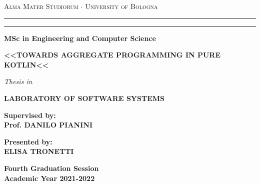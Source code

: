 \begin{titlepage}
    \begin{center}
    {{\Large{
        \textsc{Alma Mater Studiorum $\cdot$ University of Bologna}
    }}}
    \rule[0.1cm]{15.8cm}{0.1mm}
    \rule[0.5cm]{15.8cm}{0.6mm}
    {\small{\bf MSc in Engineering and Computer Science}}
    \vspace{41mm} %
    \end{center}
    \begin{center}
        \huge\bf <<TOWARDS AGGREGATE PROGRAMMING IN PURE KOTLIN<<
    \end{center}
    \vspace{41mm} %
    \begin{center}
    {{\emph{Thesis in}}}
    
    \vspace{1mm}
    {{\bf{LABORATORY OF SOFTWARE SYSTEMS}}}
    \vspace{18mm}
    \end{center}
    \par
    \noindent
    \begin{minipage}[t]{0.47\textwidth}
    {\large{\bf Supervised by:\\
    Prof. DANILO PIANINI}}
    \end{minipage}
    \hfill
    \begin{minipage}[t]{0.47\textwidth}\raggedleft
    {\large{\bf Presented by:\\
    ELISA TRONETTI}}
    \end{minipage}
    \vspace{20mm}
    \begin{center}
    {\large{\bf Fourth Graduation Session\\
    Academic Year 2021-2022}}
    \end{center}
\end{titlepage}
